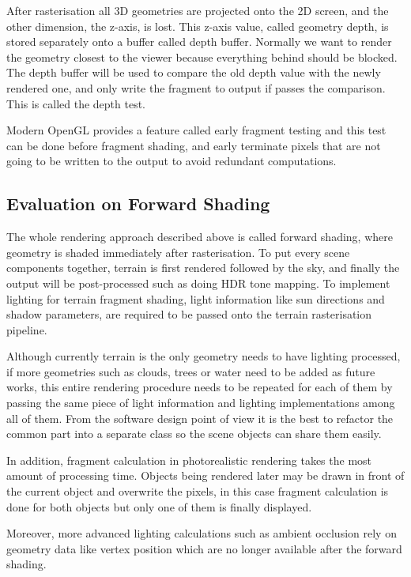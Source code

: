 \documentclass[oneside, a4paper]{report}
\begin{document}
    After rasterisation all 3D geometries are projected onto the 2D screen, and the other dimension, the z-axis, is lost. This z-axis value, called geometry depth, is stored separately onto a buffer called depth buffer. Normally we want to render the geometry closest to the viewer because everything behind should be blocked. The depth buffer will be used to compare the old depth value with the newly rendered one, and only write the fragment to output if passes the comparison. This is called the depth test.

    Modern OpenGL provides a feature called early fragment testing and this test can be done before fragment shading, and early terminate pixels that are not going to be written to the output to avoid redundant computations.

    \subsection{Evaluation on Forward Shading}

    The whole rendering approach described above is called forward shading, where geometry is shaded immediately after rasterisation. To put every scene components together, terrain is first rendered followed by the sky, and finally the output will be post-processed such as doing HDR tone mapping. To implement lighting for terrain fragment shading, light information like sun directions and shadow parameters, are required to be passed onto the terrain rasterisation pipeline.

    Although currently terrain is the only geometry needs to have lighting processed, if more geometries such as clouds, trees or water need to be added as future works, this entire rendering procedure needs to be repeated for each of them by passing the same piece of light information and lighting implementations among all of them. From the software design point of view it is the best to refactor the common part into a separate class so the scene objects can share them easily.

    In addition, fragment calculation in photorealistic rendering takes the most amount of processing time. Objects being rendered later may be drawn in front of the current object and overwrite the pixels, in this case fragment calculation is done for both objects but only one of them is finally displayed.

    Moreover, more advanced lighting calculations such as ambient occlusion rely on geometry data like vertex position which are no longer available after the forward shading.
\end{document}
